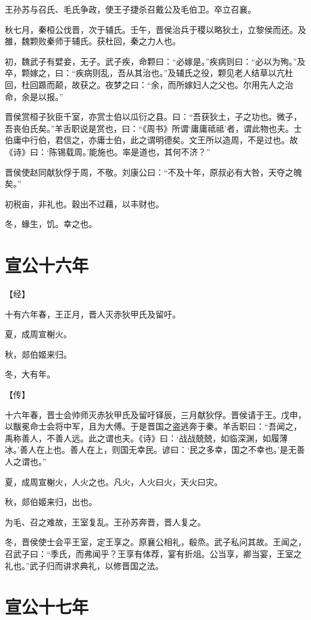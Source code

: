 \documentclass[a4paper,12pt,UTF8,twoside]{ctexbook}
\begin{document}
王孙苏与召氏、毛氏争政，使王子捷杀召戴公及毛伯卫。卒立召襄。

秋七月，秦桓公伐晋，次于辅氏。壬午，晋侯治兵于稷以略狄土，立黎侯而还。及雒，魏颗败秦师于辅氏。获杜回，秦之力人也。

初，魏武子有嬖妾，无子。武子疾，命颗曰：“必嫁是。”疾病则曰：“必以为殉。”及卒，颗嫁之，曰：“疾病则乱，吾从其治也。”及辅氏之役，颗见老人结草以亢杜回，杜回踬而颠，故获之。夜梦之曰：“余，而所嫁妇人之父也。尔用先人之治命，余是以报。”

晋侯赏桓子狄臣千室，亦赏士伯以瓜衍之县。曰：“吾获狄土，子之功也。微子，吾丧伯氏矣。”羊舌职说是赏也，曰：“《周书》所谓‘庸庸祗祗’者，谓此物也夫。士伯庸中行伯，君信之，亦庸士伯，此之谓明德矣。文王所以造周，不是过也。故《诗》曰：‘陈锡载周。’能施也。率是道也，其何不济？”

晋侯使赵同献狄俘于周，不敬。刘康公曰：“不及十年，原叔必有大咎，天夺之魄矣。”

初税亩，非礼也。穀出不过藉，以丰财也。

冬，蝝生，饥。幸之也。


\chapter{宣公十六年}



【经】

十有六年春，王正月，晋人灭赤狄甲氏及留吁。

夏，成周宣榭火。

秋，郯伯姬来归。

冬，大有年。

【传】

十六年春，晋士会帅师灭赤狄甲氏及留吁铎辰，三月献狄俘。晋侯请于王。戊申，以黻冕命士会将中军，且为大傅。于是晋国之盗逃奔于秦。羊舌职曰：“吾闻之，禹称善人，不善人远。此之谓也夫。《诗》曰：‘战战兢兢，如临深渊，如履薄冰。’善人在上也。善人在上，则国无幸民。谚曰：‘民之多幸，国之不幸也。’是无善人之谓也。”

夏，成周宣榭火，人火之也。凡火，人火曰火，天火曰灾。

秋，郯伯姬来归，出也。

为毛、召之难故，王室复乱。王孙苏奔晋，晋人复之。

冬，晋侯使士会平王室，定王享之。原襄公相礼，殽烝。武子私问其故。王闻之，召武子曰：“季氏，而弗闻乎？王享有体荐，宴有折俎。公当享，卿当宴，王室之礼也。”武子归而讲求典礼，以修晋国之法。



\chapter{宣公十七年}
\end{document}
